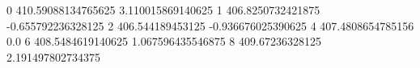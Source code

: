 0 410.59088134765625 3.110015869140625
1 406.8250732421875 -0.655792236328125
2 406.544189453125 -0.936676025390625
4 407.4808654785156 0.0
6 408.5484619140625 1.067596435546875
8 409.67236328125 2.191497802734375

